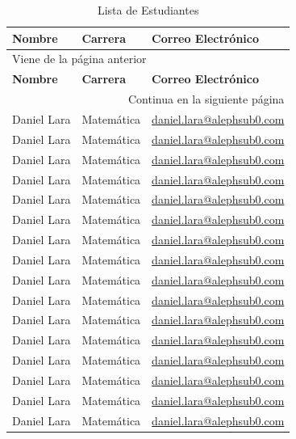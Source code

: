 \documentclass[a4,10pt]{aleph-notas}
\begin{document}
\begin{center}
 \begin{longtable}{lll}
  \caption{Lista de Estudiantes}\\
        \toprule
        \textbf{Nombre}  & \textbf{Carrera}  &  \textbf{Correo Electrónico} \\
        \midrule
  \endfirsthead
        \multicolumn{3}{l}{\footnotesize Viene de la página anterior}\\
        \toprule
        \textbf{Nombre}  & \textbf{Carrera}  &  \textbf{Correo Electrónico} \\ \midrule
  \endhead
        \bottomrule  \multicolumn{3}{r}{\footnotesize Continua en la siguiente página}
  \endfoot 
        \bottomrule
  \endlastfoot
%  
  Daniel Lara      &	Matemática	& \url{daniel.lara@alephsub0.com}  \\
  Daniel Lara      &	Matemática	& \url{daniel.lara@alephsub0.com}  \\
  Daniel Lara      &	Matemática	& \url{daniel.lara@alephsub0.com}  \\
  Daniel Lara      &	Matemática	& \url{daniel.lara@alephsub0.com}  \\
  Daniel Lara      &	Matemática	& \url{daniel.lara@alephsub0.com}  \\
  Daniel Lara      &	Matemática	& \url{daniel.lara@alephsub0.com}  \\
  Daniel Lara      &	Matemática	& \url{daniel.lara@alephsub0.com}  \\
  Daniel Lara      &	Matemática	& \url{daniel.lara@alephsub0.com}  \\
  Daniel Lara      &	Matemática	& \url{daniel.lara@alephsub0.com}  \\
  Daniel Lara      &	Matemática	& \url{daniel.lara@alephsub0.com}  \\
  Daniel Lara      &	Matemática	& \url{daniel.lara@alephsub0.com}  \\
  Daniel Lara      &	Matemática	& \url{daniel.lara@alephsub0.com}  \\
  Daniel Lara      &	Matemática	& \url{daniel.lara@alephsub0.com}  \\
  Daniel Lara      &	Matemática	& \url{daniel.lara@alephsub0.com}  \\
  Daniel Lara      &	Matemática	& \url{daniel.lara@alephsub0.com}  \\
  Daniel Lara      &	Matemática	& \url{daniel.lara@alephsub0.com}  \\
  Daniel Lara      &	Matemática	& \url{daniel.lara@alephsub0.com}  \\

\end{longtable}
\end{center}
\end{document}

